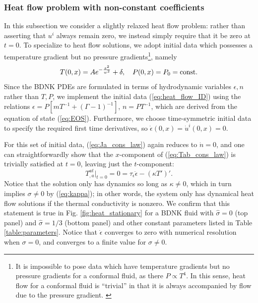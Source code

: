 \documentclass[%
notitlepage,
superscriptaddress,
nofootinbib,
amsmath,
amssymb,
aps,
twocolumn
]{revtex4-1}
\begin{document}
\subsubsection{Heat flow problem with non-constant coefficients}

In this subsection we consider a slightly relaxed heat flow problem: rather than asserting that $u^{i}$ always remain zero, we instead simply require that it be zero at $t = 0$.  To specialize to heat flow solutions, we adopt initial data which possesses a temperature gradient but no pressure gradients\footnote{It is impossible to pose data which have temperature gradients but no pressure gradients for a conformal fluid, as there $P \propto T^4$.  In this sense, heat flow for a conformal fluid is ``trivial'' in that it is always accompanied by flow due to the pressure gradient. \label{footnote:heat_flow}}, 
namely
\begin{equation} \label{eq:heat_flow_ID}
T(0, x) = A e^{-\frac{x^2}{w^2}} + \delta, ~~~ P(0, x) = P_0 = \textnormal{const}.
\end{equation}
Since the BDNK PDEs are formulated in terms of hydrodynamic variables $\epsilon, n$ rather than $T, P$, we implement the initial data (\ref{eq:heat_flow_ID}) using the relations ${\epsilon = P [m T^{-1} + (\Gamma - 1)^{-1}]}$, ${n = P T^{-1}}$, which are derived from the equation of state (\ref{eq:EOS}).  Furthermore, we choose time-symmetric initial data to specify the required first time derivatives, so $\dot{\epsilon}(0,x) = \dot{u}^{i}(0,x) = 0$.

For this set of initial data, (\ref{eq:Ja_cons_law}) again reduces to $\dot{n} = 0$, and one can straightforwardly show that the $x$-component of (\ref{eq:Tab_cons_law}) is trivially satisfied at $t = 0$, leaving just the $t$-component:
\begin{equation} \label{eq:heat_ID_EOM}
T^{at}_{,a} \Big|_{t=0} = 0 = \tau_{\epsilon} \ddot{\epsilon} - (\kappa T')'.
\end{equation}
Notice that the solution only has dynamics so long as $\kappa \neq 0$,
which in turn implies $\sigma \neq 0$ by (\ref{eq:kappa}); in other words,
the system only has dynamical heat flow solutions if the thermal
conductivity is nonzero.  We confirm that this statement is true in Fig.
\ref{fig:heat_stationary} for a BDNK fluid with $\hat{\sigma} = 0$ (top
panel) and $\hat{\sigma} = 1/3$ (bottom panel) and other constant
parameters listed in Table \ref{table:parameters}.  Notice that
$\dot{\epsilon}$ converges to zero with numerical resolution when $\sigma =
0$, and converges to a finite value for $\sigma \neq 0$. 
\end{document}
